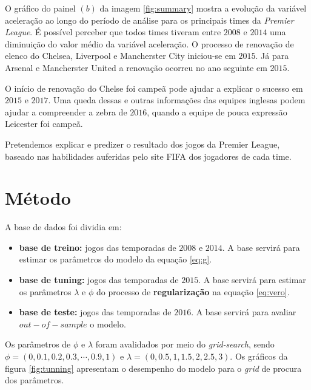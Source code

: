 \documentclass[doc,apacite,oneside,a4paper,12pt]{apa6}
\begin{document}
O gráfico do painel $(b)$ da imagem \ref{fig:summary} mostra a evolução da variável aceleração ao longo do período de análise para os principais times da \textit{Premier League}. É possível perceber que todos times tiveram entre $2008$ e $2014$ uma diminuição do valor médio da variável aceleração. O processo de renovação de elenco do Chelsea, Liverpool e Mancherster City iniciou-se em $2015$. Já para Arsenal e Mancherster United a renovação ocorreu no ano seguinte em $2015$.

O início de renovação do Chelse foi campeã pode ajudar a explicar o sucesso em $2015$ e $2017$. Uma queda dessas e outras informações das equipes inglesas podem ajudar a compreender a zebra de $2016$, quando a equipe de pouca expressão Leicester foi campeã. 

Pretendemos explicar e predizer o resultado dos jogos da Premier League, baseado nas habilidades auferidas pelo site FIFA dos jogadores de cada time.

\section{Método}
\label{sec:metodo}

A base de dados foi dividia em:
\begin{itemize}
\item \textbf{base de treino:} jogos das temporadas de $2008$ e $2014$. A base servirá para estimar os parâmetros do modelo da equação \ref{eq:g}.
\item \textbf{base de tuning:} jogos das temporadas de $2015$. A base servirá para estimar os parâmetros $\lambda$ e $\phi$ do processo de \textbf{regularização} na equação \ref{eq:vero}.
\item \textbf{base de teste:} jogos das temporadas de $2016$. A base servirá para avaliar $out-of-sample$ o modelo.
\end{itemize}


Os parâmetros de $\phi$ e $\lambda$ foram avalidados por meio do \textit{grid-search}, sendo $\phi = (0 , 0.1,0.2,0.3,\cdots,0.9,1)$ e  $\lambda =( 0,0.5,1,1.5,2,2.5,3)$. Os gráficos da figura \ref{fig:tunning} apresentam o desempenho do modelo para o \textit{grid} de procura dos parâmetros.
\end{document}
